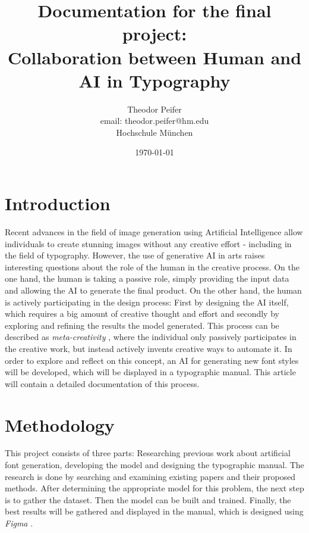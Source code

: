 \documentclass[11pt]{article}
\title{\textbf{Documentation for the final project: \\ Collaboration between Human and AI in Typography}}
\author{Theodor Peifer \\ email: theodor.peifer@hm.edu \\ Hochschule München}
\date{\today}
\begin{document}
\maketitle

\section{Introduction}
Recent advances in the field of image generation using Artificial Intelligence allow individuals to create stunning images without any creative effort - including in the field of typography.
However, the use of generative AI in arts raises interesting questions about the role of the human in the creative process. On the one hand, the human is taking a passive role, simply providing the input data and allowing the AI to generate the final product. On the other hand, the human is actively participating in the design process: First by designing the AI itself, which requires a big amount of creative thought and effort and secondly by exploring and refining the results the model generated.
This process can be described as \emph{meta-creativity} \cite{metaCreativity}, where the individual only passively participates in the creative work, but instead actively invents creative ways to automate it.
In order to explore and reflect on this concept, an AI for generating new font styles will be developed, which will be displayed in a typographic manual. This article will contain a detailed documentation of this process.


\section{Methodology}
This project consists of three parts: Researching previous work about artificial font generation, developing the model and designing the typographic manual.
The research is done by searching and examining existing papers and their proposed methods. After determining the appropriate model for this problem, the next step is to gather the dataset. Then the model can be built and trained. Finally, the best results will be gathered and displayed in the manual, which is designed using \emph{Figma} \cite{figmaUIDesignTool}.
\end{document}
